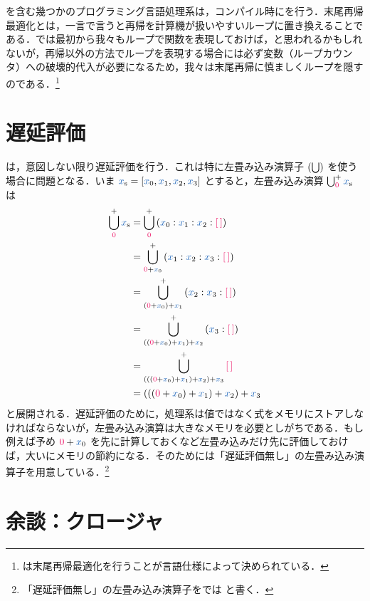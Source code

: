 \documentclass[a5paper,twoside,fleqn,draft]{jsbook}
\begin{document}
\haskell を含む幾つかのプログラミング言語処理系は，コンパイル時にを行う．末尾再帰最適化とは，一言で言うと再帰を計算機が扱いやすいループに置き換えることである．では最初から我々もループで関数を表現しておけば，と思われるかもしれないが，再帰以外の方法でループを表現する場合には必ず変数（ループカウンタ）への破壊的代入が必要になるため，我々は末尾再帰に慎ましくループを隠すのである．\footnote{\scheme は末尾再帰最適化を行うことが言語仕様によって決められている．}

\section{遅延評価}

\haskell は，意図しない限り遅延評価を行う．これは特に左畳み込み演算子 $(\operatorname*{\bigcup})$ を使う場合に問題となる．いま $\hListVar{x}=[\hVar{x}_0,\hVar{x}_1,\hVar{x}_2,\hVar{x}_3]$ とすると，左畳み込み演算 $\hFold^+_{\hConstant{0}}\hListVar{x}$ は
\begin{align}
  \hFold^+_{\hConstant{0}}\hListVar{x}
  &=\hFold^+_{\hConstant{0}}{}(\hVar{x}_0:\hVar{x}_1:\hVar{x}_2:{\hEmptyList})\\
  &=\hFold^+_{\hConstant{0}+\hVar{x}_0}{}(\hVar{x}_1:\hVar{x}_2:\hVar{x}_3:{\hEmptyList})\\
  &=\hFold^+_{(\hConstant{0}+\hVar{x}_0)+\hVar{x}_1}{}(\hVar{x}_2:\hVar{x}_3:{\hEmptyList})\\
  &=\hFold^+_{((\hConstant{0}+\hVar{x}_0)+\hVar{x}_1)+\hVar{x}_2}{}(\hVar{x}_3:{\hEmptyList})\\
  &=\hFold^+_{(((\hConstant{0}+\hVar{x}_0)+\hVar{x}_1)+\hVar{x}_2)+\hVar{x}_3}{}{\hEmptyList}\\
  &=(((\hConstant{0}+\hVar{x}_0)+\hVar{x}_1)+\hVar{x}_2)+\hVar{x}_3
\end{align}
と展開される．遅延評価のために，\haskell 処理系は値ではなく式をメモリにストアしなければならないが，左畳み込み演算は大きなメモリを必要としがちである．もし例えば予め $\hConstant{0}+\hVar{x}_0$ を先に計算しておくなど左畳み込みだけ先に評価しておけば，大いにメモリの節約になる．そのために\haskell は「遅延評価無し」の左畳み込み演算子を用意している．\footnote{「遅延評価無し」の左畳み込み演算子を\haskell では  と書く．}

%

\section{余談：クロージャ}
\end{document}
